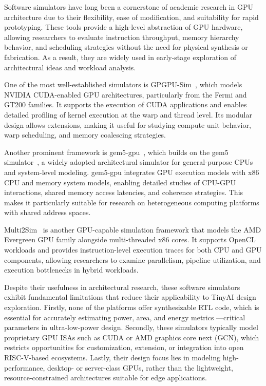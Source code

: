                 Software simulators have long been a cornerstone of academic research in GPU architecture due to their flexibility, ease of modification, and suitability for rapid prototyping. These tools provide a high-level abstraction of GPU hardware, allowing researchers to evaluate instruction throughput, memory hierarchy behavior, and scheduling strategies without the need for physical synthesis or fabrication. As a result, they are widely used in early-stage exploration of architectural ideas and workload analysis.
                
                One of the most well-established simulators is GPGPU-Sim~\cite{GPGPU-sim}, which models NVIDIA CUDA-enabled GPU architectures, particularly from the Fermi and GT200 families. It supports the execution of CUDA applications and enables detailed profiling of kernel execution at the warp and thread level. Its modular design allows extensions, making it useful for studying compute unit behavior, warp scheduling, and memory coalescing strategies.
                
                Another prominent framework is gem5-gpu~\cite{gem5-gpu}, which builds on the gem5 simulator~\cite{gem5}, a widely adopted architectural simulator for general-purpose CPUs and system-level modeling. gem5-gpu integrates GPU execution models with x86 CPU and memory system models, enabling detailed studies of CPU-GPU interactions, shared memory access latencies, and coherence strategies. This makes it particularly suitable for research on heterogeneous computing platforms with shared address spaces.
                
                Multi2Sim~\cite{multi2sim} is another GPU-capable simulation framework that models the AMD Evergreen GPU family alongside multi-threaded x86 cores. It supports OpenCL workloads and provides instruction-level execution traces for both CPU and GPU components, allowing researchers to examine parallelism, pipeline utilization, and execution bottlenecks in hybrid workloads.
                
                Despite their usefulness in architectural research, these software simulators exhibit fundamental limitations that reduce their applicability to TinyAI design exploration. Firstly, none of the platforms offer synthesizable RTL code, which is essential for accurately estimating power, area, and energy metrics —critical parameters in ultra-low-power design. Secondly, these simulators typically model proprietary GPU ISAs such as CUDA or AMD graphics core next (GCN), which restricts opportunities for customization, extension, or integration into open RISC-V-based ecosystems. Lastly, their design focus lies in modeling high-performance, desktop- or server-class GPUs, rather than the lightweight, resource-constrained architectures suitable for edge applications.
                

